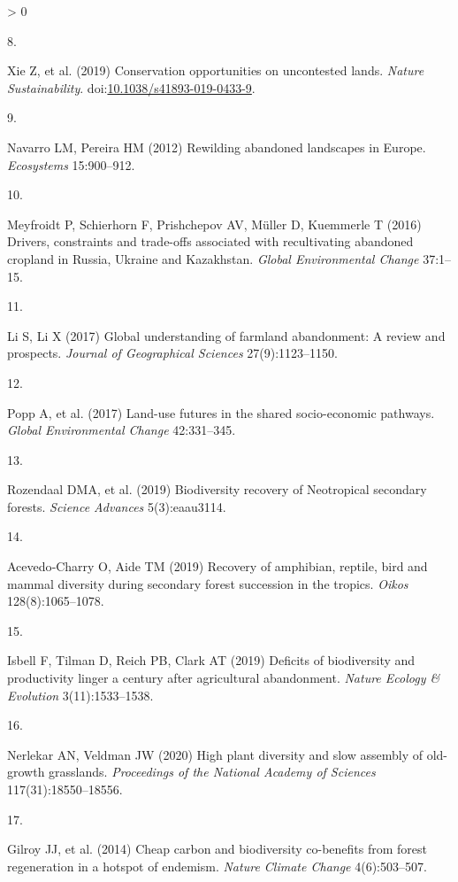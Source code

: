 \documentclass[9pt,twocolumn,twoside,lineno]{pnas-new}
\newlength{\csllabelwidth}
\newlength{\cslhangindent}
\newenvironment{CSLReferences}[2] %
 {%
  \setlength{\parindent}{0pt}
  \ifodd #1 \everypar{\setlength{\hangindent}{\cslhangindent}}\ignorespaces\fi
  \ifnum #2 > 0
  \setlength{\parskip}{#2\baselineskip}
  \fi
 }%
 {}
\newcommand{\CSLLeftMargin}[1]{\parbox[t]{\csllabelwidth}{#1}}
\newcommand{\CSLRightInline}[1]{\parbox[t]{\linewidth - \csllabelwidth}{#1}\break}
\begin{document}
\begin{CSLReferences}{0}{0}
\leavevmode\hypertarget{ref-Xie2019}{}%
\CSLLeftMargin{8. }
\CSLRightInline{Xie Z, et al. (2019) {Conservation opportunities on uncontested lands}. \emph{Nature Sustainability}. doi:\href{https://doi.org/10.1038/s41893-019-0433-9}{10.1038/s41893-019-0433-9}.}

\leavevmode\hypertarget{ref-Navarro2012}{}%
\CSLLeftMargin{9. }
\CSLRightInline{Navarro LM, Pereira HM (2012) {Rewilding abandoned landscapes in Europe}. \emph{Ecosystems} 15:900--912.}

\leavevmode\hypertarget{ref-Meyfroidt2016}{}%
\CSLLeftMargin{10. }
\CSLRightInline{Meyfroidt P, Schierhorn F, Prishchepov AV, Müller D, Kuemmerle T (2016) {Drivers, constraints and trade-offs associated with recultivating abandoned cropland in Russia, Ukraine and Kazakhstan}. \emph{Global Environmental Change} 37:1--15.}

\leavevmode\hypertarget{ref-Li2017}{}%
\CSLLeftMargin{11. }
\CSLRightInline{Li S, Li X (2017) {Global understanding of farmland abandonment: A review and prospects}. \emph{Journal of Geographical Sciences} 27(9):1123--1150.}

\leavevmode\hypertarget{ref-Popp2017}{}%
\CSLLeftMargin{12. }
\CSLRightInline{Popp A, et al. (2017) {Land-use futures in the shared socio-economic pathways}. \emph{Global Environmental Change} 42:331--345.}

\leavevmode\hypertarget{ref-Rozendaal2019}{}%
\CSLLeftMargin{13. }
\CSLRightInline{Rozendaal DMA, et al. (2019) {Biodiversity recovery of Neotropical secondary forests}. \emph{Science Advances} 5(3):eaau3114.}

\leavevmode\hypertarget{ref-Acevedo-Charry2019}{}%
\CSLLeftMargin{14. }
\CSLRightInline{Acevedo‐Charry O, Aide TM (2019) {Recovery of amphibian, reptile, bird and mammal diversity during secondary forest succession in the tropics}. \emph{Oikos} 128(8):1065--1078.}

\leavevmode\hypertarget{ref-Isbell2019}{}%
\CSLLeftMargin{15. }
\CSLRightInline{Isbell F, Tilman D, Reich PB, Clark AT (2019) {Deficits of biodiversity and productivity linger a century after agricultural abandonment}. \emph{Nature Ecology {\&} Evolution} 3(11):1533--1538.}

\leavevmode\hypertarget{ref-Nerlekar2020}{}%
\CSLLeftMargin{16. }
\CSLRightInline{Nerlekar AN, Veldman JW (2020) {High plant diversity and slow assembly of old-growth grasslands}. \emph{Proceedings of the National Academy of Sciences} 117(31):18550--18556.}

\leavevmode\hypertarget{ref-Gilroy2014}{}%
\CSLLeftMargin{17. }
\CSLRightInline{Gilroy JJ, et al. (2014) {Cheap carbon and biodiversity co-benefits from forest regeneration in a hotspot of endemism}. \emph{Nature Climate Change} 4(6):503--507.}


\end{CSLReferences}
\end{document}
